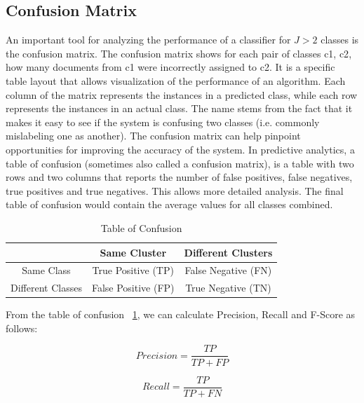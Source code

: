 \subsection{Confusion Matrix}
An important tool for analyzing the performance of a classifier for $J > 2$ classes is the confusion matrix. The confusion matrix shows for each pair of classes {c1, c2}, how many documents from c1 were incorrectly assigned to c2. It is a specific table layout that allows visualization of the performance of an algorithm. Each column of the matrix represents the instances in a predicted class, while each row represents the instances in an actual class. The name stems from the fact that it makes it easy to see if the system is confusing two classes (i.e. commonly mislabeling one as another). The confusion matrix can help pinpoint opportunities for improving the accuracy of the system. In predictive analytics, a table of confusion (sometimes also called a confusion matrix), is a table with two rows and two columns that reports the number of false positives, false negatives, true positives and true negatives. This allows more detailed analysis. The final table of confusion would contain the average values for all classes combined.

\begin{table}[ht]
\caption{Table of Confusion} %
\centering  %
\begin{tabular}{c c c} %
\hline\hline                        %
 & Same Cluster & Different Clusters \\ [0.5ex] %
\hline                  %
Same Class & True Positive (TP)&False Negative (FN)\\ %
Different Classes & False Positive (FP)& True Negative (TN)  \\[1ex]      %
\hline %
\end{tabular}
\label{table:conf} %
\end{table}

From the table of confusion ~\ref{table:conf}, we can calculate Precision, Recall and F-Score as follows:

\begin{equation}
Precision =\frac{TP}{TP + FP}
\end{equation}

\begin{equation}
Recall =\frac{TP}{TP + FN}
\end{equation}

